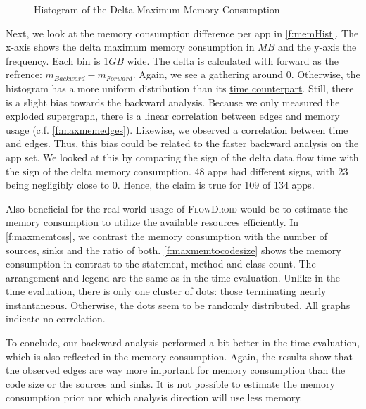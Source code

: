 \documentclass[../draft.tex]{subfiles}
\begin{document}
    \begin{figure}[ht]
        \centering
        \resizebox{0.75\columnwidth}{!}{
            
        }
        \caption{Histogram of the Delta Maximum Memory Consumption}
        \label{f:memHist}
    \end{figure}

    Next, we look at the memory consumption difference per app in \autoref{f:memHist}. 
    The x-axis shows the delta maximum memory consumption in $MB$ and the y-axis the frequency. 
    Each bin is $1GB$ wide.
    The delta is calculated with forward as the refrence: $m_{\mathit{Backward}}-m_{\mathit{Forward}}$. 
    Again, we see a gathering around $0$. Otherwise, the histogram has a more uniform distribution than its \hyperref[f:deltaHist]{time counterpart}.
    Still, there is a slight bias towards the backward analysis. 
    Because we only measured the exploded supergraph, there is a linear correlation between edges and memory usage (c.f. \autoref{f:maxmemedges}). 
    Likewise, we observed a correlation between time and edges. Thus, this bias could be related to the faster backward analysis on the app set. We looked at this by comparing the sign of the delta data flow time with the sign of the delta memory consumption. 48 apps had different signs, with 23 being negligibly close to 0. Hence, the claim is true for 109 of 134 apps.

    Also beneficial for the real-world usage of \textsc{FlowDroid} would be to estimate the memory consumption to utilize the available resources efficiently. 
    In \autoref{f:maxmemtoss}, we contrast the memory consumption with the number of sources, sinks and the ratio of both. \autoref{f:maxmemtocodesize} shows the memory consumption in contrast to the statement, method and class count. 
    The arrangement and legend are the same as in the time evaluation.
    Unlike in the time evaluation, there is only one cluster of dots: those terminating nearly instantaneous. Otherwise, the dots seem to be randomly distributed. All graphs indicate no correlation.

    To conclude, our backward analysis performed a bit better in the time evaluation, which is also reflected in the memory consumption. Again, the results show that the observed edges are way more important for memory consumption than the code size or the sources and sinks. It is not possible to estimate the memory consumption prior nor which analysis direction will use less memory. 
\end{document}
